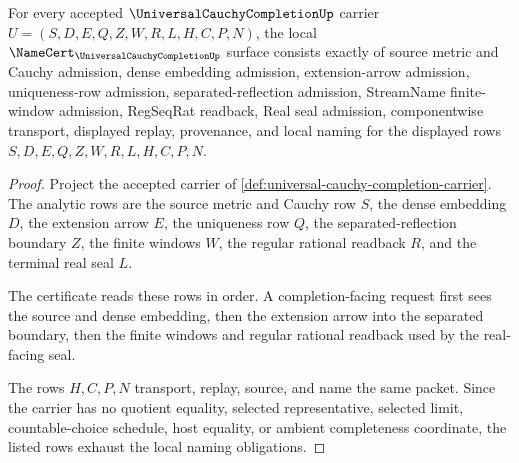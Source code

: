 \begin{theorem}
\label{thm:universal-cauchy-completion-namecert-obligations}
For every accepted $\UniversalCauchyCompletionUp$ carrier $U=(S,D,E,Q,Z,W,R,L,H,C,P,N)$, the local $\NameCert_{\UniversalCauchyCompletionUp}$ surface consists exactly of source metric and Cauchy admission, dense embedding admission, extension-arrow admission, uniqueness-row admission, separated-reflection admission, StreamName finite-window admission, RegSeqRat readback, Real seal admission, componentwise transport, displayed replay, provenance, and local naming for the displayed rows $S,D,E,Q,Z,W,R,L,H,C,P,N$.
\end{theorem}
\begin{proof}
Project the accepted carrier of \autoref{def:universal-cauchy-completion-carrier}. The analytic rows are the source metric and Cauchy row $S$, the dense embedding $D$, the extension arrow $E$, the uniqueness row $Q$, the separated-reflection boundary $Z$, the finite windows $W$, the regular rational readback $R$, and the terminal real seal $L$.

The certificate reads these rows in order. A completion-facing request first sees the source and dense embedding, then the extension arrow into the separated boundary, then the finite windows and regular rational readback used by the real-facing seal.

The rows $H,C,P,N$ transport, replay, source, and name the same packet. Since the carrier has no quotient equality, selected representative, selected limit, countable-choice schedule, host equality, or ambient completeness coordinate, the listed rows exhaust the local naming obligations.
\end{proof}

